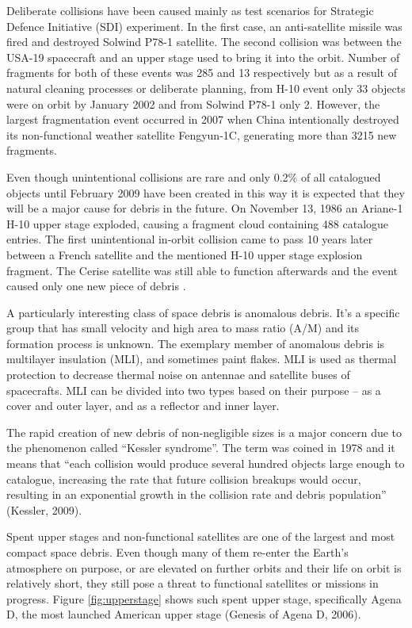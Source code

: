 	Deliberate collisions have been caused mainly as test scenarios for Strategic Defence Initiative (SDI) experiment. In the first case, an anti-satellite missile was fired and destroyed Solwind P78-1 satellite. The second collision was between the USA-19 spacecraft and an upper stage used to bring it into the orbit. Number of fragments for both of these events was 285 and 13 respectively but as a result of natural cleaning processes or deliberate planning, from H-10 event only 33 objects were on orbit by January 2002 and from Solwind P78-1 only 2. However, the largest fragmentation event occurred in 2007 when China intentionally destroyed its non-functional weather satellite Fengyun-1C, generating more than 3215 new fragments. 
	
	Even though unintentional collisions are rare and only 0.2\% of all catalogued objects until February 2009 have been created in this way it is expected that they will be a major cause for debris in the future. On November 13, 1986 an Ariane-1 H-10 upper stage exploded, causing a fragment cloud containing 488 catalogue entries. The first unintentional in-orbit collision came to pass 10 years later between a French satellite and the mentioned H-10 upper stage explosion fragment. The Cerise satellite was still able to function afterwards and the event caused only one new piece of debris \citep{Silha2012id}. 
	
	A particularly interesting class of space debris is anomalous debris. It’s a specific group that has small velocity and high area to mass ratio (A/M) and its formation process is unknown. The exemplary member of anomalous debris is multilayer insulation (MLI), and sometimes paint flakes. MLI is used as thermal protection to decrease thermal noise on antennae and satellite buses of spacecrafts. MLI can be divided into two types based on their purpose – as a cover and outer layer, and as a reflector and inner layer.
	
	The rapid creation of new debris of non-negligible sizes is a major concern due to the phenomenon called “Kessler syndrome”. The term was coined in 1978 and it means that “each collision would produce several hundred objects large enough to catalogue, increasing the rate that future collision breakups would occur, resulting in an exponential growth in the collision rate and debris population” (Kessler, 2009). 
	
	Spent upper stages and non-functional satellites are one of the largest and most compact space debris. Even though many of them re-enter the Earth's atmosphere on purpose, or are elevated on further orbits and their life on orbit is relatively short, they still pose a threat to functional satellites or missions in progress. Figure \ref{fig:upperstage} shows such spent upper stage, specifically Agena D, the most launched American upper stage (Genesis of Agena D, 2006).
	
